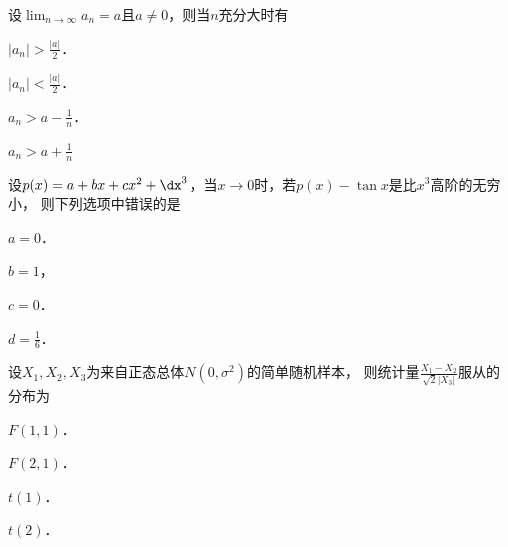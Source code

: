 \documentclass[plain,noanswer,medmath]{../../template/jnuexam}
\begin{document}






\begin{problem}
设$\lim_{n \to \infty} a_n = a$且$a \ne 0$，则当$n$充分大时有\pickout{}
\begin{abcd}
\item $|a_n| > \frac{|a|}{2}$．
\item $|a_n| < \frac{|a|}{2}$．
\item $a_n > a - \frac{1}{n}$．
\item $a_n > a + \frac{1}{n}$
\end{abcd}
\end{problem}




\begin{problem}
设$p(x) = a + bx + cx^2 + \dx^3$，当$x \to 0$时，若$p(x) - \tan x$是比$x^3$高阶的无穷小，
则下列选项中错误的是\pickout{}
\begin{abcd}
\item $a = 0$．
\item $b = 1$，
\item $c = 0$．
\item $d = \frac{1}{6}$．
\end{abcd}
\end{problem}










\begin{problem}
设$X_1,X_2,X_3$为来自正态总体$N(0,\sigma^2)$的简单随机样本，
则统计量$\frac{X_1 - X_2}{\sqrt{2}|X_3|}$服从的分布为\pickout{}
\begin{abcd}
\item $F(1,1)$．
\item $F(2,1)$．
\item $t(1)$．
\item $t(2)$．
\end{abcd}
\end{problem}


\end{document}
